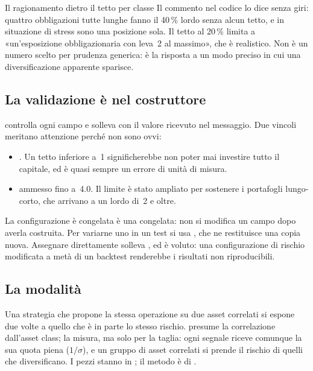 \begin{nota}{Il ragionamento dietro il tetto per classe}
Il commento nel codice lo dice senza giri: quattro obbligazioni tutte lunghe
fanno il \num{40}\,\% lordo senza alcun tetto, e in situazione di stress sono
una posizione sola. Il tetto al \num{20}\,\% limita a «un'esposizione
obbligazionaria con leva~2 al massimo», che è realistico. Non è un numero
scelto per prudenza generica: è la risposta a un modo preciso in cui una
diversificazione apparente sparisce.
\end{nota}

\subsection{La validazione è nel costruttore}

 controlla ogni campo e solleva 
con il valore ricevuto nel messaggio. Due vincoli meritano attenzione perché
non sono ovvi:

\begin{itemize}
  \item {}. Un tetto inferiore a~\num{1}
        significherebbe non poter mai investire tutto il capitale, ed è quasi
        sempre un errore di unità di misura.
  \item {} ammesso fino a~\num{4.0}. Il limite è
        stato ampliato per sostenere i portafogli lungo-corto, che arrivano
        a un lordo di~\num{2} e oltre.
\end{itemize}

\begin{attenzione}{La configurazione è congelata}
 è una  congelata: non si modifica un
campo dopo averla costruita. Per variarne uno in un test si usa
, che ne
restituisce una copia nuova. Assegnare direttamente solleva
, ed è voluto: una configurazione di rischio
modificata a metà di un backtest renderebbe i risultati non riproducibili.
\end{attenzione}

\subsection{La modalità }\label{sez:sizing-correlato}

Una strategia che propone la stessa operazione su due asset correlati si
espone due volte a quello che è in parte lo stesso rischio. 
presume la correlazione dall'asset class;  la misura, ma solo
per la taglia: ogni segnale riceve comunque la sua quota piena ($1/\sigma$),
e un gruppo di asset correlati si prende il rischio di quelli che
diversificano. I pezzi stanno in ; il metodo
è  di .


